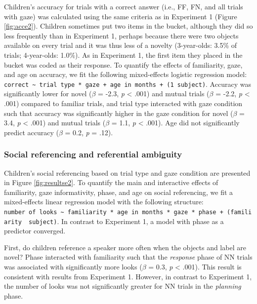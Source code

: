 \documentclass[english,man]{apa6}
\theoremstyle{definition}
\theoremstyle{definition}
\theoremstyle{definition}
\theoremstyle{remark}
\begin{document}
Children's accuracy for trials with a correct answer (i.e., FF, FN, and
all trials with gaze) was calculated using the same criteria as in
Experiment 1 (Figure \ref{fig:acce2}). Children sometimes put two items
in the bucket, although they did so less frequently than in Experiment
1, perhaps because there were two objects available on every trial and
it was thus less of a novelty (3-year-olds: 3.5\% of trials;
4-year-olds: 1.0\%). As in Experiment 1, the first item they placed in
the bucket was coded as their response. To quantify the effects of
familiarity, gaze, and age on accuracy, we fit the following
mixed-effects logistic regression model:
\texttt{correct\ \textasciitilde{}\ trial\ type\ *\ gaze\ +\ age\ in\ months\ +\ (1\textbar{}\ subject)}.
Accuracy was significantly lower for novel (\(\beta\) = -2.3, \emph{p}
\textless{} .001) and mutual trials (\(\beta\) = -2.2, \emph{p}
\textless{} .001) compared to familiar trials, and trial type interacted
with gaze condition such that accuracy was significantly higher in the
gaze condition for novel (\(\beta\) = 3.4, \emph{p} \textless{} .001)
and mutual trials (\(\beta\) = 1.1, \emph{p} \textless{} .001). Age did
not significantly predict accuracy (\(\beta\) = 0.2, \emph{p} = .12).

\subsubsection{Social referencing and referential
ambiguity}\label{social-referencing-and-referential-ambiguity}

Children's social referencing based on trial type and gaze condition are
presented in Figure \ref{fig:resultse2}. To quantify the main and
interactive effects of familiarity, gaze informativity, phase, and age
on social referencing, we fit a mixed-effects linear regression model
with the following structure:
\texttt{number\ of\ looks\ \textasciitilde{}\ familiarity\ *\ age\ in\ months\ *\ gaze\ *\ phase\ +\ (familiarity\ \textbar{}\ subject)}.
In contrast to Experiment 1, a model with phase as a predictor
converged.

First, do children reference a speaker more often when the objects and
label are novel? Phase interacted with familiarity such that the
\emph{response} phase of NN trials was associated with significantly
more looks (\(\beta\) = 0.3, \emph{p} \textless{} .001). This result is
consistent with results from Experiment 1. However, in contrast to
Experiment 1, the number of looks was not significantly greater for NN
trials in the \emph{planning} phase.
\end{document}
